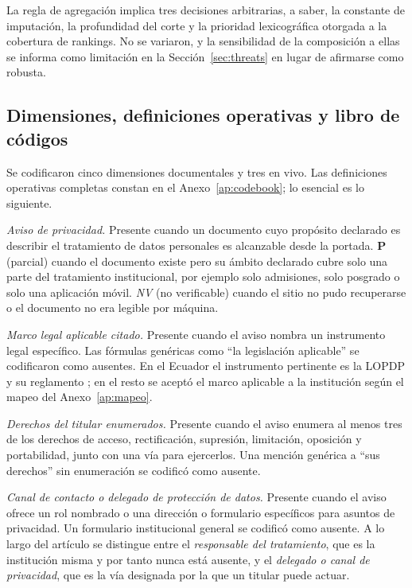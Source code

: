 \documentclass[pdflatex,sn-basic,Numbered]{sn-jnl}
\newcommand{\nv}{\textsl{\footnotesize NV}}
\theoremstyle{thmstyleone}
\theoremstyle{thmstyletwo}
\theoremstyle{thmstylethree}
\begin{document}
La regla de agregaci\'on implica tres decisiones arbitrarias, a saber, la constante de imputaci\'on, la profundidad del corte y la prioridad lexicogr\'afica otorgada a la cobertura de rankings. No se variaron, y la sensibilidad de la composici\'on a ellas se informa como limitaci\'on en la Secci\'on~\ref{sec:threats} en lugar de afirmarse como robusta.

\subsection{Dimensiones, definiciones operativas y libro de c\'odigos}\label{sec:methods-codebook}

Se codificaron cinco dimensiones documentales y tres en vivo. Las definiciones operativas completas constan en el Anexo~\ref{ap:codebook}; lo esencial es lo siguiente.

\emph{Aviso de privacidad.} Presente cuando un documento cuyo prop\'osito declarado es describir el tratamiento de datos personales es alcanzable desde la portada. \textbf{P} (parcial) cuando el documento existe pero su \'ambito declarado cubre solo una parte del tratamiento institucional, por ejemplo solo admisiones, solo posgrado o solo una aplicaci\'on m\'ovil. \nv{} (no verificable) cuando el sitio no pudo recuperarse o el documento no era legible por m\'aquina.

\emph{Marco legal aplicable citado.} Presente cuando el aviso nombra un instrumento legal espec\'ifico. Las f\'ormulas gen\'ericas como ``la legislaci\'on aplicable'' se codificaron como ausentes. En el Ecuador el instrumento pertinente es la LOPDP y su reglamento \citep{lopdp2021,reglamentolopdp2023}; en el resto se acept\'o el marco aplicable a la instituci\'on seg\'un el mapeo del Anexo~\ref{ap:mapeo}.

\emph{Derechos del titular enumerados.} Presente cuando el aviso enumera al menos tres de los derechos de acceso, rectificaci\'on, supresi\'on, limitaci\'on, oposici\'on y portabilidad, junto con una v\'ia para ejercerlos. Una menci\'on gen\'erica a ``sus derechos'' sin enumeraci\'on se codific\'o como ausente.

\emph{Canal de contacto o delegado de protecci\'on de datos.} Presente cuando el aviso ofrece un rol nombrado o una direcci\'on o formulario espec\'ificos para asuntos de privacidad. Un formulario institucional general se codific\'o como ausente. A lo largo del art\'iculo se distingue entre el \emph{responsable del tratamiento}, que es la instituci\'on misma y por tanto nunca est\'a ausente, y el \emph{delegado o canal de privacidad}, que es la v\'ia designada por la que un titular puede actuar.
\end{document}
